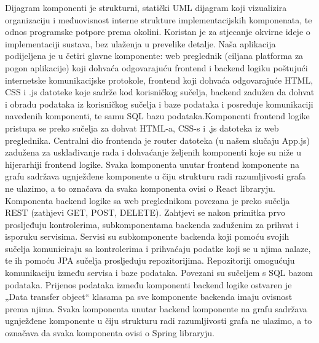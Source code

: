 	

        \noindent \newline Dijagram komponenti je strukturni, statički UML dijagram koji vizualizira organizaciju i međuovisnost interne strukture implementacijskih komponenata, te odnos programske potpore prema okolini. Koristan je za stjecanje okvirne ideje o implementaciji sustava, bez ulaženja u prevelike detalje. 
        \newline Naša aplikacija podijeljena je u četiri glavne komponente: web preglednik (ciljana platforma za pogon aplikacije) koji dohvaća odgovarajuću frontend i backend logiku poštujući internetske komunikacijske protokole, frontend koji dohvaća odgovarajuće HTML, CSS i .js datoteke koje sadrže kod korisničkog sučelja, backend zadužen da dohvat i obradu podataka iz korisničkog sučelja i baze podataka i posreduje komunikaciji navedenih komponenti, te samu SQL bazu podataka.\newline Komponenti frontend logike pristupa se preko sučelja za dohvat HTML-a, CSS-s i .js datoteka iz web preglednika. Centralni dio frontenda je router datoteka (u našem slučaju App.js) zadužena za usklađivanje rada i dohvaćanje željenih komponenti koje su niže u hijerarhiji frontend logike. Svaka komponenta unutar frontend komponente na grafu sadržava ugnježđene komponente u čiju strukturu radi razumljivosti grafa ne ulazimo, a to označava da svaka komponenta ovisi o React libraryju. \newline Komponenta backend logike sa web preglednikom povezana je preko sučelja REST (zathjevi GET, POST, DELETE). Zahtjevi se nakon primitka prvo prosljeđuju kontrolerima, subkomponentama backenda zaduženim za prihvat i isporuku servisima. Servisi su subkomponente backenda koji pomoću svojih sučelja komuniciraju sa kontrolerima i prihvaćaju podatke koji se u njima nalaze, te ih pomoću JPA sučelja prosljeđuju repozitorijima. Repozitoriji omogućuju komunikaciju između servisa i baze podataka. Povezani su sučeljem s SQL bazom podataka. Prijenos podataka između komponenti backend logike ostvaren je „Data transfer object“ klasama pa sve komponente backenda imaju ovisnost prema njima. Svaka komponenta unutar backend komponente na grafu sadržava ugnježđene komponente u čiju strukturu radi razumljivosti grafa ne ulazimo, a to označava da svaka komponenta ovisi o Spring libraryju. 

